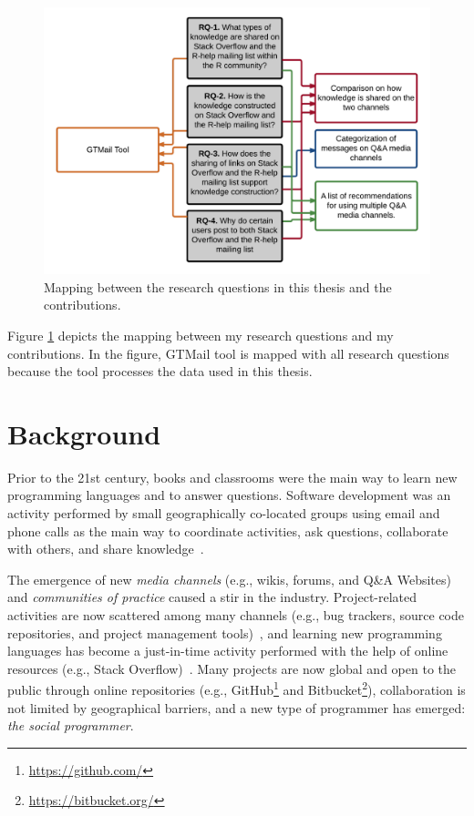 \documentclass{sig-alternate-05-2015}
\begin{document}
	\begin{figure}[!htb]
		\centering
		\includegraphics[width=1\columnwidth]{Figures/RQ-contributions}
		\caption{Mapping between the research questions in this thesis and the contributions.}
		\label{fig:RQ-contributions}
	\end{figure}

	Figure \ref{fig:RQ-contributions} depicts the mapping between my research questions and my contributions. 
	In the figure, GTMail tool is mapped with all research questions because the tool processes the data used in this thesis.


\section{Background}
\label{cha:background}
	Prior to the 21st century, books and classrooms were the main way to learn new programming languages and to answer questions.
	Software development was an activity performed by small geographically co-located groups using email and phone calls as the main way to coordinate activities, ask questions, collaborate with others, and share knowledge~\cite{Storey2014}.

	The emergence of new \textit{media channels} (e.g., wikis, forums, and Q\&A Websites) and \textit{communities of practice} caused a stir in the industry.  
	Project-related activities are now scattered among many channels (e.g., bug trackers, source code repositories, and project management tools)~\cite{Guzzi2013}, and learning new programming languages has become a just-in-time activity performed with the help of online resources (e.g., Stack Overflow)~\cite{Sim2013,Storey2010,Hartmann2008}.
	Many projects are now global and open to the public through online repositories (e.g., GitHub\footnote{\url{https://github.com/}} and  Bitbucket\footnote{\url{https://bitbucket.org/}}), collaboration is not limited by geographical barriers, and a new type of programmer has emerged: \textit{the social programmer}. 
\end{document}
